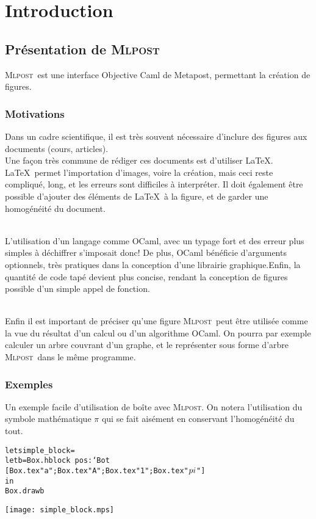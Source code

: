 \documentclass[a4paper,12pt]{article}
\newcommand{\mlpost}{\textsc{Mlpost}}
\begin{document}
\section{Introduction}

\subsection{Présentation de \mlpost}
\mlpost\ est une interface Objective Caml de Metapost, permettant la création de figures.
\subsubsection{Motivations}
Dans un cadre scientifique, il est très souvent nécessaire d'inclure des figures aux documents (cours, articles).
~\\Une façon très commune de rédiger ces documents est d'utiliser \LaTeX. \LaTeX\ permet l'importation d'images, voire la création, mais ceci reste compliqué, long, et les erreurs sont difficiles à interpréter. Il doit également être possible d'ajouter des éléments de \LaTeX\ à la figure, et de garder une homogénéité du document. 

~\\L'utilisation d'un langage comme OCaml, avec un typage fort et des erreur plus simples à déchiffrer s'imposait donc! De plus, OCaml bénéficie d'arguments optionnels, très pratiques dans la conception d'une librairie graphique.Enfin, la quantité de code tapé devient plus concise, rendant la conception de figures possible d'un simple appel de fonction.

~\\Enfin il est important de préciser qu'une figure \mlpost\ peut être utilisée comme la vue du résultat d'un calcul ou d'un algorithme OCaml. On pourra par exemple calculer un arbre couvrant d'un graphe, et le représenter sous forme d'arbre \mlpost\ dans le même programme.

\subsubsection{Exemples}
Un exemple facile d'utilisation de boîte avec \mlpost. On notera l'utilisation du symbole mathématique $\pi$ qui se fait aisément en conservant l'homogénéité du tout. 
~\\

\begin{minipage}{0.7\linewidth}
  \begin{alltt}
    let simple_block =
    let b = Box.hblock ~pos:`Bot 
    [Box.tex "a"; Box.tex "A"; Box.tex "1"; Box.tex "$\\pi$"] 
    in
    Box.draw b
  \end{alltt}
\end{minipage}
\begin{minipage}{0.3\linewidth}
  \begin{center}
    \texttt{[image: simple\_block.mps]}
  \end{center}
\end{minipage}
\end{document}

